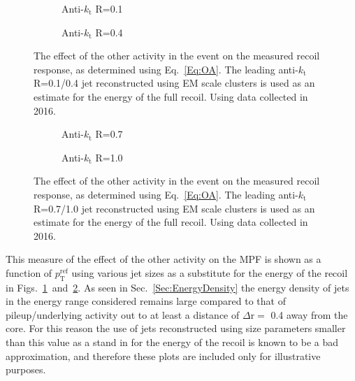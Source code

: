 \begin{figure}[!ht]
  \centering
  \begin{subfigure}{.5\textwidth}
    \centering
    \caption{Anti-$k_\mathrm{t}$ R=0.1}
  \end{subfigure}%
  \begin{subfigure}{.5\textwidth}  \centering
    \caption{Anti-$k_\mathrm{t}$ R=0.4}
  \end{subfigure}
  \caption[$\Delta^{\mathrm{OA}}$ using anti-$k_\mathrm{t}$ R=0.1/0.4 jets]
{\small The effect of the other activity in the event on the measured recoil response, as determined using Eq.~\ref{Eq:OA}.  The leading anti-$k_\mathrm{t}$ R=0.1/0.4 jet reconstructed using EM scale clusters is used as an estimate for the energy of the full recoil.  Using data collected in 2016.  }
  \label{Fig:OA_1-4}
\end{figure}


\begin{figure}[!ht]
  \centering
  \begin{subfigure}{.5\textwidth}
    \centering
    \caption{Anti-$k_\mathrm{t}$ R=0.7}
  \end{subfigure}%
  \begin{subfigure}{.5\textwidth}  \centering
    \caption{Anti-$k_\mathrm{t}$ R=1.0}
  \end{subfigure}
  \caption[$\Delta^{\mathrm{OA}}$ using anti-$k_\mathrm{t}$ R=0.7/1.0 jets]
{\small The effect of the other activity in the event on the measured recoil response, as determined using Eq.~\ref{Eq:OA}.  The leading anti-$k_\mathrm{t}$ R=0.7/1.0 jet reconstructed using EM scale clusters is used as an estimate for the energy of the full recoil.  Using data collected in 2016.  }
  \label{Fig:OA_7-10}
\end{figure}

This measure of the effect of the other activity on the MPF is shown as a function of $p_{\mathrm T}^{\mathrm {ref}}$ using various jet sizes as a substitute for the energy of the recoil in Figs.~\ref{Fig:OA_1-4}~and~\ref{Fig:OA_7-10}.  
As seen in Sec.~\ref{Sec:EnergyDensity} the energy density of jets in the energy range considered remains large compared to that of pileup/underlying activity out to at least a distance of $\Delta\mathrm{r}=$ 0.4 away from the core.  
For this reason the use of jets reconstructed using size parameters smaller than this value as a stand in for the energy of the recoil is known to be a bad approximation, and therefore these plots are included only for illustrative purposes.  

